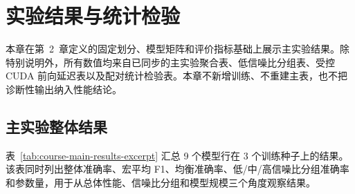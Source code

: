 %
%
%
%
%
%
%

\chapter{实验结果与统计检验}

本章在第~2~章定义的固定划分、模型矩阵和评价指标基础上展示主实验结果。除特别说明外，所有数值均来自已同步的主实验聚合表、低信噪比分组表、受控 CUDA 前向延迟表以及配对统计检验表。本章不新增训练、不重建主表，也不把诊断性输出纳入性能结论。

\section{主实验整体结果}\label{sec:results-main}

表~\ref{tab:course-main-results-excerpt} 汇总 9 个模型行在 3 个训练种子上的结果。该表同时列出整体准确率、宏平均 F1、均衡准确率、低/中/高信噪比分组准确率和参数量，用于从总体性能、信噪比分组和模型规模三个角度观察结果。


